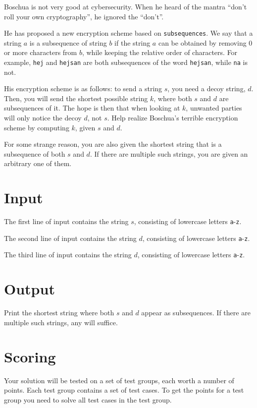 \noindent
Boschua is not very good at cybersecurity. When he heard of the mantra ``don't roll your own cryptography'', he
ignored the ``don't''.

He has proposed a new encryption scheme based on \texttt{subsequences}. We say that a string $a$ is a subsequence
of string $b$ if the string $a$ can be obtained by removing $0$ or more characters from $b$, while keeping the
relative order of characters. For example, \texttt{hej} and \texttt{hejsan} are both subsequences of the word
\texttt{hejsan}, while \texttt{na} is not. 

His encryption scheme is as follows: to send a string $s$, you need a decoy string, $d$. Then, you will send
the shortest possible string $k$, where both $s$ and $d$ are subsequences of it. The hope is then that when
looking at $k$, unwanted parties will only notice the decoy $d$, not $s$. Help realize Boschua's
terrible encryption scheme by computing $k$, given $s$ and $d$.

For some strange reason, you are also given the shortest string that is a subsequence of both $s$ and $d$.
If there are multiple such strings, you are given an arbitrary one of them.

\section*{Input}
The first line of input contains the string $s$, consisting of lowercase letters \texttt{a}-\texttt{z}.

The second line of input contains the string $d$, consisting of lowercase letters \texttt{a}-\texttt{z}.

The third line of input contains the string $d$, consisting of lowercase letters \texttt{a}-\texttt{z}.

\section*{Output}
Print the shortest string where both $s$ and $d$ appear as subsequences. If there are multiple such strings, any will suffice.

\section*{Scoring}
Your solution will be tested on a set of test groups, each worth a number of points. Each test group contains
a set of test cases. To get the points for a test group you need to solve all test cases in the test group.

